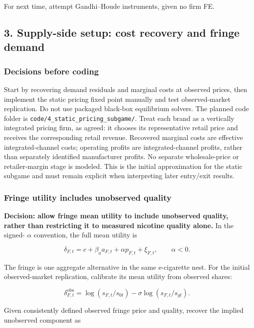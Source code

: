 \documentclass[10pt,]{article}
\begin{document}
For next time, attempt Gandhi--Houde instruments, given no firm FE.

\subsection{3. Supply-side setup: cost recovery and fringe
demand}\label{supply-side-setup-cost-recovery-and-fringe-demand}

\subsubsection{Decisions before coding}\label{decisions-before-coding}

Start by recovering demand residuals and marginal costs at observed
prices, then implement the static pricing fixed point manually and test
observed-market replication. Do not use packaged black-box equilibrium
solvers. The planned code folder is
\texttt{code/4\_static\_pricing\_subgame/}. Treat each brand as a
vertically integrated pricing firm, as agreed: it chooses its
representative retail price and receives the corresponding retail
revenue. Recovered marginal costs are effective integrated-channel
costs; operating profits are integrated-channel profits, rather than
separately identified manufacturer profits. No separate wholesale-price
or retailer-margin stage is modeled. This is the initial approximation
for the static subgame and must remain explicit when interpreting later
entry/exit results.

\subsubsection{Fringe utility includes unobserved
quality}\label{fringe-utility-includes-unobserved-quality}

\textbf{Decision: allow fringe mean utility to include unobserved
quality, rather than restricting it to measured nicotine quality alone.}
In the signed- \(\alpha\) convention, the full mean utility is

\[
\delta_{F,t}=c+\beta_a a_{F,t}+\alpha  p_{F,t}+\xi_{F,t},\qquad \alpha <0.
\]

The fringe is one aggregate alternative in the same e-cigarette nest.
For the initial observed-market replication, calibrate its mean utility
from observed shares:

\[
\delta_{F,t}^{\mathrm{obs}}
=\log(s_{F,t}/s_{0t})
-\sigma\log(s_{F,t}/s_{gt}).
\]

Given consistently defined observed fringe price and quality, recover
the implied unobserved component as
\end{document}
